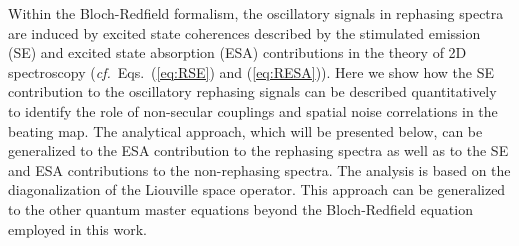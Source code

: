 \documentclass[%
 reprint,%
 amssymb, amsmath,%
 aip,cha,%
]{revtex4-1}
\begin{document}
Within the Bloch-Redfield formalism, the oscillatory signals in rephasing spectra are induced by excited state coherences described by the stimulated emission (SE) and excited state absorption (ESA) contributions in the theory of 2D spectroscopy \cite{JonasARPC2003} ({\it cf.}~Eqs.~(\ref{eq:RSE}) and (\ref{eq:RESA})). Here we show how the SE contribution to the oscillatory rephasing signals can be described quantitatively to identify the role of non-secular couplings and spatial noise correlations in the beating map. The analytical approach, which will be presented below, can be generalized to the ESA contribution to the rephasing spectra as well as to the SE and ESA contributions to the non-rephasing spectra.  The analysis is based on the diagonalization of the Liouville space operator.  This approach can be generalized to the other quantum master equations beyond the Bloch-Redfield equation employed in this work.
\end{document}
